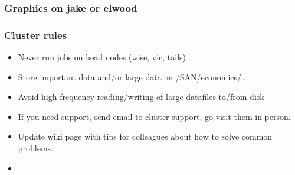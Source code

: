 \documentclass{beamer}
\begin{document}
\begin{frame}
\frametitle{Graphics on jake or elwood}

\end{frame}

\begin{frame}
\frametitle{Cluster rules}
\begin{itemize}
\item Never run jobs on head nodes (wise, vic, tails)
\item Store important data and/or large data on /SAN/economics/...
\item Avoid high frequency reading/writing of large datafiles to/from disk
\item If you need support, send email to cluster support, go visit them in person.
\item Update wiki page with tips for colleagues about how to solve common problems.
\item 
\end{itemize}
\end{frame}
\end{document}

